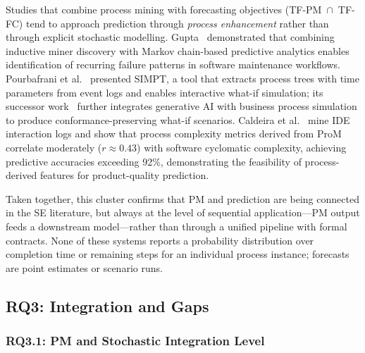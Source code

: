 Studies that combine process mining with forecasting objectives (TF-PM~$\cap$~TF-FC)
tend to approach prediction through \emph{process enhancement} rather than
through explicit stochastic modelling. Gupta~\cite{gupta2017} demonstrated that
combining inductive miner discovery with Markov chain-based predictive analytics
enables identification of recurring failure patterns in software maintenance
workflows. Pourbafrani et al.~\cite{pourbafrani2021} presented SIMPT, a tool
that extracts process trees with time parameters from event logs and enables
interactive what-if simulation; its successor work~\cite{buliga2025} further
integrates generative AI with business process simulation to produce
conformance-preserving what-if scenarios. Caldeira et al.~\cite{caldeira2022}
mine IDE interaction logs and show that process complexity metrics derived from
ProM correlate moderately ($r \approx 0.43$) with software cyclomatic
complexity, achieving predictive accuracies exceeding 92\%, demonstrating the
feasibility of process-derived features for product-quality prediction.

Taken together, this cluster confirms that PM and prediction are being connected
in the SE literature, but always at the level of sequential application---PM
output feeds a downstream model---rather than through a unified pipeline with
formal contracts. None of these systems reports a probability distribution
over completion time or remaining steps for an individual process instance;
forecasts are point estimates or scenario runs.


\subsection{RQ3: Integration and Gaps}
\label{sec:slr-rq3}

\subsubsection{RQ3.1: PM and Stochastic Integration Level}

